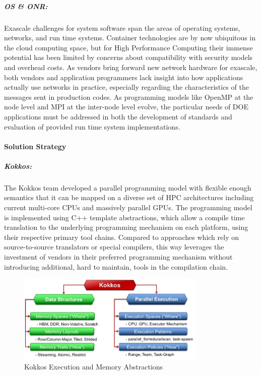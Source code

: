 \subparagraph{OS \& ONR:} Exascale challenges for system software span the areas of operating systems, networks, and run time systems.  Container technologies are by now ubiquitous in the cloud computing space, but for High Performance Computing their immense potential has been limited by concerns about compatibility with security models and overhead costs.  As vendors bring forward new network hardware for exascale, both vendors and application programmers lack insight into how applications actually use networks in practice, especially regarding the characteristics of the messages sent in production codes.  As programming models like OpenMP at the node level and MPI at the inter-node level evolve, the particular needs of DOE applications must be addressed in both the development of standards and evaluation of provided run time system implementations.



\paragraph{Solution Strategy}

\subparagraph{Kokkos: } The Kokkos team developed a parallel programming model with flexible enough semantics that it can be mapped on a diverse set of HPC architectures including current multi-core CPUs and massively parallel GPUs.
The programming model is implemented using C++ template abstractions, which allow a compile time translation to the underlying programming mechanism on each platform, using their respective primary tool chains.
Compared to approaches which rely on source-to-source translators or special compilers, this way leverages the investment of vendors in their preferred programming mechanism without introducing additional, hard to maintain, tools in the compilation chain.

\begin{figure}[ht!]
\centering
\includegraphics[width=90mm]{projects/2.3.6-NNSA/2.3.6.03-SNL-ATDM/kokkos-abstractions.jpg}
\caption{Kokkos Execution and Memory Abstractions}
\end{figure}

